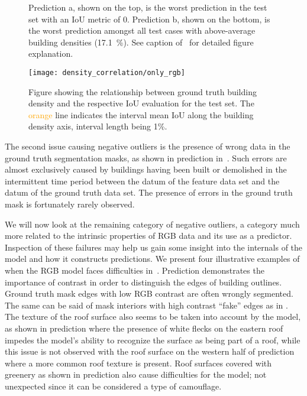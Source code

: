 \begin{figure}[H]
  \centering
  \caption{%
    Prediction \thefigure a, shown on the top, is the worst prediction in the test set with an IoU metric of \num{0}.
    Prediction \thefigure b, shown on the bottom, is the worst prediction amongst all test cases with above-average building densities (\SI{17.1}{\percent}).
    See caption of~ for detailed figure explanation.
  }%
  \label{fig:rgb-fundamental-issues}
\end{figure}
\vspace{-\baselineskip}
\begin{figure}[H]
  \texttt{[image: density\_correlation/only\_rgb]}
  \caption{%
    Figure showing the relationship between ground truth building density and the respective IoU evaluation for the test set.
    The \textcolor{orange}{orange} line indicates the interval mean IoU along the building density axis, interval length being 1\%.
  }%
  \label{fig:rgb-density-relationship}
\end{figure}

The second issue causing negative outliers is the presence of wrong data in the ground truth segmentation masks, as shown in prediction  in~.
Such errors are almost exclusively caused by buildings having been built or demolished in the intermittent time period between the datum of the feature data set and the datum of the ground truth data set.
The presence of errors in the ground truth mask is fortunately rarely observed.

We will now look at the remaining category of negative outliers, a category much more related to the intrinsic properties of RGB data and its use as a predictor.
Inspection of these failures may help us gain some insight into the internals of the model and how it constructs predictions.
We present four illustrative examples of when the RGB model faces difficulties in~.
Prediction  demonstrates the importance of contrast in order to distinguish the edges of building outlines.
Ground truth mask edges with low RGB contrast are often wrongly segmented.
The same can be said of mask interiors with high contrast \enquote{fake} edges as in .
The texture of the roof surface also seems to be taken into account by the model, as shown in prediction  where the presence of white flecks on the eastern roof impedes the model's ability to recognize the surface as being part of a roof, while this issue is not observed with the roof surface on the western half of prediction  where a more common roof texture is present.
Roof surfaces covered with greenery as shown in prediction  also cause difficulties for the model; not unexpected since it can be considered a type of camouflage.


